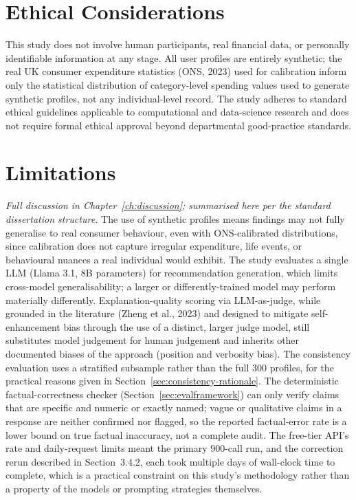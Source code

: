 \section{Ethical Considerations}
\label{sec:ethics}

This study does not involve human participants, real financial data, or personally identifiable information at any stage. All user profiles are entirely synthetic; the real UK consumer expenditure statistics (ONS, 2023) used for calibration inform only the statistical distribution of category-level spending values used to generate synthetic profiles, not any individual-level record. The study adheres to standard ethical guidelines applicable to computational and data-science research and does not require formal ethical approval beyond departmental good-practice standards.

\section{Limitations}
\label{sec:limitations}

\textit{Full discussion in Chapter~\ref{ch:discussion}; summarised here per the standard dissertation structure.} The use of synthetic profiles means findings may not fully generalise to real consumer behaviour, even with ONS-calibrated distributions, since calibration does not capture irregular expenditure, life events, or behavioural nuances a real individual would exhibit. The study evaluates a single LLM (Llama 3.1, 8B parameters) for recommendation generation, which limits cross-model generalisability; a larger or differently-trained model may perform materially differently. Explanation-quality scoring via LLM-as-judge, while grounded in the literature (Zheng et al., 2023) and designed to mitigate self-enhancement bias through the use of a distinct, larger judge model, still substitutes model judgement for human judgement and inherits other documented biases of the approach (position and verbosity bias). The consistency evaluation uses a stratified subsample rather than the full 300 profiles, for the practical reasons given in Section~\ref{sec:consistency-rationale}. The deterministic factual-correctness checker (Section~\ref{sec:evalframework}) can only verify claims that are specific and numeric or exactly named; vague or qualitative claims in a response are neither confirmed nor flagged, so the reported factual-error rate is a lower bound on true factual inaccuracy, not a complete audit. The free-tier API's rate and daily-request limits meant the primary 900-call run, and the correction rerun described in Section~3.4.2, each took multiple days of wall-clock time to complete, which is a practical constraint on this study's methodology rather than a property of the models or prompting strategies themselves.
